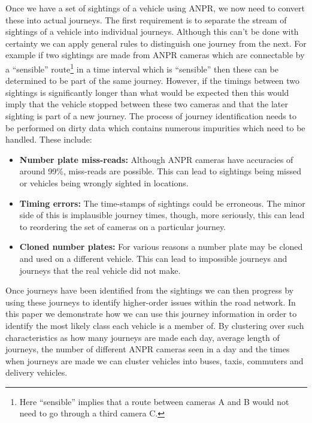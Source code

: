 Once we have a set of sightings of a vehicle using ANPR, we now need to convert these into actual journeys. The first requirement is to separate the stream of sightings of a vehicle into individual journeys. Although this can't be done with certainty we can apply general rules to distinguish one journey from the next. For example if two sightings are made from ANPR cameras which are connectable by a ``sensible'' route\footnote{Here ``sensible'' implies that a route between cameras A and B would not need to go through a third camera C.} in a time interval which is ``sensible'' then these can be determined to be part of the same journey. However, if the timings between two sightings is significantly longer than what would be expected then this would imply that the vehicle stopped between these two cameras and that the later sighting is part of a new journey. The process of journey identification needs to be performed on dirty data which contains numerous impurities which need to be handled. These include:

\begin{itemize}
	\item {\bf Number plate miss-reads:} Although ANPR cameras have accuracies of around 99\%, miss-reads are possible. This can lead to sightings being missed or vehicles being wrongly sighted in locations.
	\vspace{0.1cm}
	\item {\bf Timing errors:} The time-stamps of sightings could be erroneous. The minor side of this is implausible journey times, though, more seriously, this can lead to reordering the set of cameras on a particular journey.
	\vspace{0.1cm}
	\item {\bf Cloned number plates:} For various reasons a number plate may be cloned and used on a different vehicle. This can lead to impossible journeys and journeys that the real vehicle did not make.
\end{itemize}

Once journeys have been identified from the sightings we can then progress by using these journeys to identify higher-order issues within the road network. In this paper we demonstrate how we can use this journey information in order to identify the most likely class each vehicle is a member of. By clustering over such characteristics as how many journeys are made each day, average length of journeys, the number of different ANPR cameras seen in a day and the times when journeys are made we can cluster vehicles into buses, taxis, commuters and delivery vehicles.

